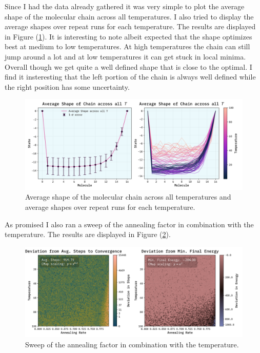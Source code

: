 \documentclass[10pt, titlepage, a4paper]{article}
\begin{document}
Since I had the data already gathered it was very simple to plot the average shape of the molecular chain across all temperatures. I also tried to 
display the average shapes over repeat runs for each temperature. The results are displayed in Figure (\ref{fig:molecular-chain-shapes}). It is 
interesting to note albeit expected that the shape optimizes best at medium to low temperatures. At high temperatures the chain can 
still jump around a lot and at low temperatures it can get stuck in local minima. Overall though we get quite a well defined shape that is close 
to the optimal. I find it insteresting that the left portion of the chain is always well defined while the right position has some uncertainty.

\begin{figure}[H]
    \centering
    \includegraphics[width=.95\textwidth]{../MolecularChain2/Images/rand-init-T-spread.png}
    \caption{Average shape of the molecular chain across all temperatures and average shapes over repeat runs for each temperature.}
    \label{fig:molecular-chain-shapes}
\end{figure}

As promised I also ran a sweep of the annealing factor in combination with the temperature. The results are displayed in Figure 
(\ref{fig:annealing-sweep}).

\begin{figure}[H]
    \centering
    \includegraphics[width=.95\textwidth]{../MolecularChain2/Images/T-aR-gridscan.png}
    \caption{Sweep of the annealing factor in combination with the temperature.}
    \label{fig:annealing-sweep}
\end{figure}
\end{document}
